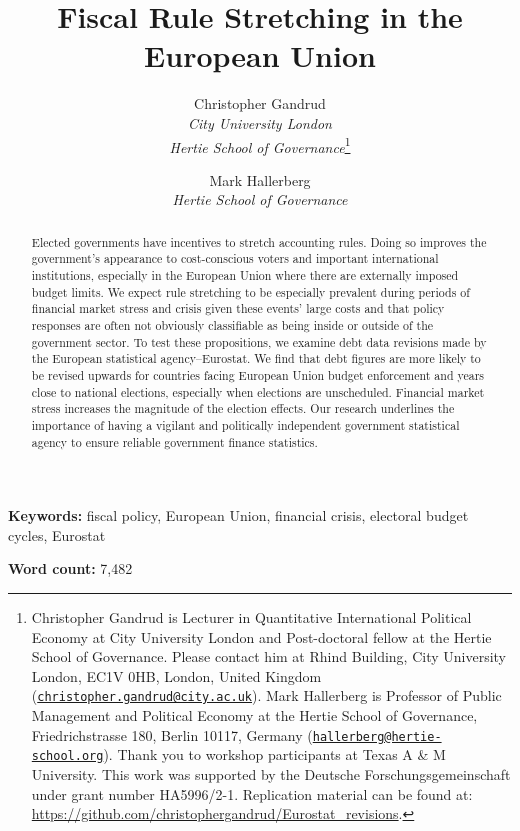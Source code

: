 \documentclass[]{article}
\title{Fiscal Rule Stretching in the European Union}
\author{Christopher Gandrud \\ \emph{City University London} \\ \emph{Hertie School of Governance}\footnote{Christopher Gandrud is Lecturer in Quantitative International Political Economy at City University London and Post-doctoral fellow at the Hertie School of Governance. Please contact him at Rhind Building, City University London, EC1V 0HB, London, United Kingdom
(\href{mailto:christopher.gandrud@city.ac.uk}{\nolinkurl{christopher.gandrud@city.ac.uk}}). Mark Hallerberg is Professor of Public Management and Political Economy at the Hertie School of Governance, Friedrichstrasse 180, Berlin 10117, Germany (\href{mailto:hallerberg@hertie-school.org}{\nolinkurl{hallerberg@hertie-school.org}}). Thank you to workshop participants at Texas A \& M University. This work was supported by the Deutsche Forschungsgemeinschaft under grant number HA5996/2-1. Replication material can be found at: \url{https://github.com/christophergandrud/Eurostat_revisions}.}
\and
Mark Hallerberg \\ \emph{Hertie School of Governance}}
\begin{document}
\maketitle

\begin{abstract}
Elected governments have incentives to stretch accounting rules. Doing so improves the government’s appearance to cost-conscious voters and important international institutions, especially in the European Union where there are externally imposed budget limits. We expect rule stretching to be especially prevalent during periods of financial market stress and crisis given these events' large costs and that policy responses are often not obviously classifiable as being inside or outside of the government sector. To test these propositions, we examine debt data revisions made by the European statistical agency--Eurostat. We find that debt figures are more likely to be revised upwards for countries facing European Union budget enforcement and years close to national elections, especially when elections are unscheduled. Financial market stress increases the magnitude of the election effects. Our research underlines the importance of having a vigilant and politically independent government statistical agency to ensure reliable government finance statistics.
\end{abstract}


\textbf{Keywords:} fiscal policy, European Union, financial crisis, electoral budget cycles, Eurostat

\textbf{Word count:} 7,482
\end{document}
